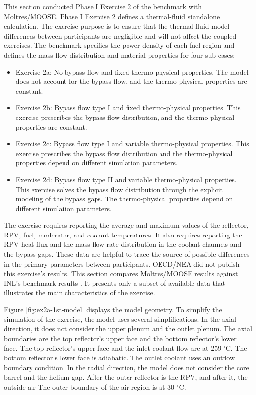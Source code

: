 This section conducted Phase I Exercise 2 of the benchmark with Moltres/MOOSE.
Phase I Exercise 2 defines a thermal-fluid standalone calculation.
The exercise purpose is to ensure that the thermal-fluid model differences between participants are negligible and will not affect the coupled exercises.
The benchmark specifies the power density of each fuel region and defines the mass flow distribution and material properties for four sub-cases:
\begin{itemize}
  \item Exercise 2a: No bypass flow and fixed thermo-physical properties. The model does not account for the bypass flow, and the thermo-physical properties are constant.
  \item Exercise 2b: Bypass flow type I and fixed thermo-physical properties. This exercise prescribes the bypass flow distribution, and the thermo-physical properties are constant.
  \item Exercise 2c: Bypass flow type I and variable thermo-physical properties. This exercise prescribes the bypass flow distribution and the thermo-physical properties depend on different simulation parameters.
  \item Exercise 2d: Bypass flow type II and variable thermo-physical properties. This exercise solves the bypass flow distribution through the explicit modeling of the bypass gaps. The thermo-physical properties depend on different simulation parameters.
\end{itemize}

The exercise requires reporting the average and maximum values of the reflector, \gls{RPV}, fuel, moderator, and coolant temperatures.
It also requires reporting the RPV heat flux and the mass flow rate distribution in the coolant channels and the bypass gaps.
These data are helpful to trace the source of possible differences in the primary parameters between participants.
OECD/NEA did not publish this exercise's results.
This section compares Moltres/MOOSE results against INL's benchmark results \cite{strydom_inl_2013}.
It presents only a subset of available data that illustrates the main characteristics of the exercise.

Figure \ref{fig:ex2a-1st-model} displays the model geometry.
To simplify the simulation of the exercise, the model uses several simplifications.
In the axial direction, it does not consider the upper plenum and the outlet plenum.
The axial boundaries are the top reflector's upper face and the bottom reflector's lower face.
The top reflector's upper face and the inlet coolant flow are at 259 $^{\circ}$C.
The bottom reflector's lower face is adiabatic.
The outlet coolant uses an outflow boundary condition.
In the radial direction, the model does not consider the core barrel and the helium gap.
After the outer reflector is the RPV, and after it, the outside air
The outer boundary of the air region is at 30 $^{\circ}$C.


